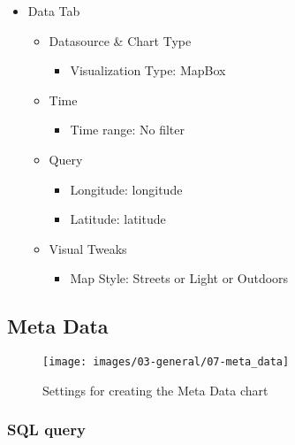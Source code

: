 \documentclass[
]{book}
\providecommand{\tightlist}{%
  \setlength{\itemsep}{0pt}\setlength{\parskip}{0pt}}
\begin{document}
\begin{itemize}
\tightlist
\item
  Data Tab

  \begin{itemize}
  \tightlist
  \item
    Datasource \& Chart Type

    \begin{itemize}
    \tightlist
    \item
      Visualization Type: MapBox
    \end{itemize}
  \item
    Time

    \begin{itemize}
    \tightlist
    \item
      Time range: No filter
    \end{itemize}
  \item
    Query

    \begin{itemize}
    \tightlist
    \item
      Longitude: longitude
    \item
      Latitude: latitude
    \end{itemize}
  \item
    Visual Tweaks

    \begin{itemize}
    \tightlist
    \item
      Map Style: Streets or Light or Outdoors
    \end{itemize}
  \end{itemize}
\end{itemize}

\hypertarget{metaDataTable}{%
\subsection*{Meta Data}\label{metaDataTable}}

\begin{figure}
\texttt{[image: images/03-general/07-meta\_data]} \caption{Settings for creating the Meta Data chart}\label{fig:metaData}
\end{figure}

\hypertarget{sql-query-5}{%
\subsubsection*{SQL query}\label{sql-query-5}}
\end{document}
